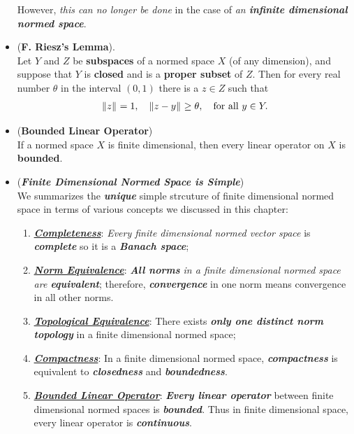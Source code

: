 \documentclass[11pt]{article}
\begin{document}
\begin{itemize}
\begin{remark}
However, \emph{this can no longer be done} in the case of \emph{an \textbf{infinite dimensional normed space}}.
\end{remark}

\item \begin{lemma} (\textbf{F. Riesz's Lemma}). \citep{kreyszig1989introductory}\\
Let $Y$ and $Z$ be \textbf{subspaces} of a normed space $X$ (of any dimension), and suppose that $Y$ is \textbf{closed} and is a \textbf{proper subset} of $Z$. Then for every real number $\theta$ in the interval $(0,1)$ there is a $z \in Z$ such that
\begin{align*}
\left\|z\right\|_{} = 1, \quad \left\|z - y\right\|_{} \ge \theta,\quad \text{for all }y \in Y.
\end{align*}
\end{lemma}

\item \begin{theorem} (\textbf{Bounded Linear Operator})\\
If a normed space $X$ is finite dimensional, then every linear operator on $X$ is \textbf{bounded}.
\end{theorem}

\item \begin{remark} (\emph{\textbf{Finite Dimensional Normed Space is Simple}})\\
We summarizes the \emph{\textbf{unique}} simple strcuture of finite dimensional normed space in terms of various concepts we discussed in this chapter:
\begin{enumerate}
\item \underline{\emph{\textbf{Completeness}}}: \emph{Every finite dimensional normed vector space} is \emph{\textbf{complete}} so it is a \emph{\textbf{Banach space}};

\item \underline{\emph{\textbf{Norm Equivalence}}}: \emph{\textbf{All norms} in a finite dimensional normed space are \textbf{equivalent}}; therefore, \emph{\textbf{convergence}} in one norm means convergence in all other norms.

\item \underline{\emph{\textbf{Topological Equivalence}}}: There exists \emph{\textbf{only one distinct norm topology}} in a finite dimensional normed space; 

\item \underline{\emph{\textbf{Compactness}}}: In a finite dimensional normed space, \emph{\textbf{compactness}} is equivalent to \emph{\textbf{closedness}} and \emph{\textbf{boundedness}}.

\item \underline{\emph{\textbf{Bounded Linear Operator}}}:  \emph{\textbf{Every linear operator}} between  finite dimensional normed spaces  is \emph{\textbf{bounded}}. Thus in finite dimensional space, every linear operator  is \emph{\textbf{continuous}}.
\end{enumerate}
\end{remark}
\end{itemize}
\end{document}
